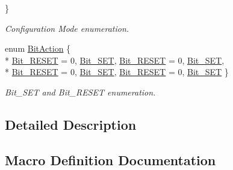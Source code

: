\begin{DoxyCompactItemize}
 \}\begin{DoxyCompactList}\small\item\em Configuration Mode enumeration. \end{DoxyCompactList}
\item 
enum \hyperlink{group___g_p_i_o___exported___types_ga176130b21c0e719121470a6042d4cf19}{Bit\+Action} \{ \\*
\hyperlink{group___g_p_i_o___exported___types_ga176130b21c0e719121470a6042d4cf19ae2c026f2b44a949f82a65f3385edef09}{Bit\+\_\+\+R\+E\+S\+ET} = 0, 
\hyperlink{group___g_p_i_o___exported___types_ga176130b21c0e719121470a6042d4cf19a3c477841a6ceec13fe47ef322432b992}{Bit\+\_\+\+S\+ET}, 
\hyperlink{group___g_p_i_o___exported___types_ga176130b21c0e719121470a6042d4cf19ae2c026f2b44a949f82a65f3385edef09}{Bit\+\_\+\+R\+E\+S\+ET} = 0, 
\hyperlink{group___g_p_i_o___exported___types_ga176130b21c0e719121470a6042d4cf19a3c477841a6ceec13fe47ef322432b992}{Bit\+\_\+\+S\+ET}, 
\\*
\hyperlink{group___g_p_i_o___exported___types_ga176130b21c0e719121470a6042d4cf19ae2c026f2b44a949f82a65f3385edef09}{Bit\+\_\+\+R\+E\+S\+ET} = 0, 
\hyperlink{group___g_p_i_o___exported___types_ga176130b21c0e719121470a6042d4cf19a3c477841a6ceec13fe47ef322432b992}{Bit\+\_\+\+S\+ET}, 
\hyperlink{group___g_p_i_o___exported___types_ga176130b21c0e719121470a6042d4cf19ae2c026f2b44a949f82a65f3385edef09}{Bit\+\_\+\+R\+E\+S\+ET} = 0, 
\hyperlink{group___g_p_i_o___exported___types_ga176130b21c0e719121470a6042d4cf19a3c477841a6ceec13fe47ef322432b992}{Bit\+\_\+\+S\+ET}
 \}\begin{DoxyCompactList}\small\item\em Bit\+\_\+\+S\+ET and Bit\+\_\+\+R\+E\+S\+ET enumeration. \end{DoxyCompactList}
\end{DoxyCompactItemize}


\subsection{Detailed Description}


\subsection{Macro Definition Documentation}
